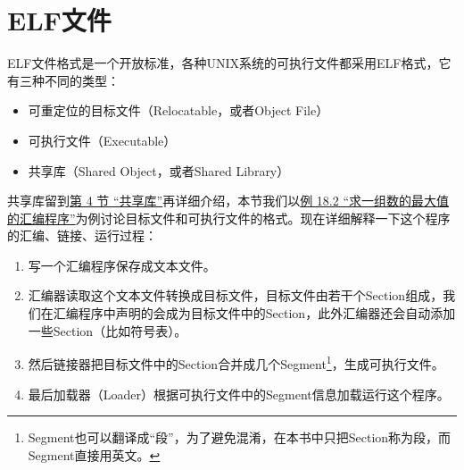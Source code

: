 
\section{ELF文件}
%
ELF文件格式是一个开放标准，各种UNIX系统的可执行文件都采用ELF格式，它有三种不同的类型：


\begin{itemize}

\item 可重定位的目标文件（Relocatable，或者Object File）

\item 可执行文件（Executable）

\item 共享库（Shared Object，或者Shared Library）
\end{itemize}


共享库留到\hyperlink{db.ch20s04.id2789683}{第 4 节 “共享库”}再详细介绍，本节我们以\hyperlink{db.ch18s03.id2769965}{例 18.\BookSplit{}2 “求一组数的最大值的汇编程序”}为例讨论目标文件和可执行文件的格式。现在详细解释一下这个程序的汇编、链接、运行过程：


\begin{enumerate}

\item 写一个汇编程序保存成文本文件。

\item 汇编器读取这个文本文件转换成目标文件，目标文件由若干个Section组成，我们在汇编程序中声明的会成为目标文件中的Section，此外汇编器还会自动添加一些Section（比如符号表）。

\item 然后链接器把目标文件中的Section合并成几个Segment\footnote[28]{Segment也可以翻译成“段”，为了避免混淆，在本书中只把Section称为段，而Segment直接用英文。}，生成可执行文件。

\item 最后加载器（Loader）根据可执行文件中的Segment信息加载运行这个程序。
\end{enumerate}


